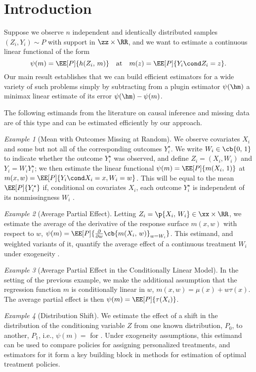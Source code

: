 \documentclass[aos,submission]{imsart}
\theoremstyle{plain}
\theoremstyle{remark}
\newtheorem{exam}{Example}
\begin{document}
\section{Introduction}
\label{sec:introduction}
Suppose we observe
$n$ independent and identically distributed samples $(Z_i, Y_i) \sim P$ with support in $\zz \times \RR$,
and we want to estimate a continuous linear functional of the form
\begin{equation}
\label{eq:psi}
\psi(m) = \EE[P]{h(Z_i, \, m)} \ \ \text{ at } \ \ m(z) = \EE[P]{Y_i \cond Z_i = z}. 
\end{equation}
Our main result establishes that we can build 
efficient estimators for a wide variety of such problems simply by subtracting from 
a plugin estimator $\psi(\hm)$ a minimax linear estimate of its error $\psi(\hm)-\psi(m)$. 

The following estimands from the literature on causal inference and missing data are of this type 
and can be estimated efficiently by our approach.

\begin{exam}[Mean with Outcomes Missing at Random]
\label{exam:mar}
We observe covariates $X_i$ and some but not all of the corresponding outcomes $Y_i^{\star}$.
We write $W_i \in \cb{0, \, 1}$ to indicate whether the outcome $Y_i^{\star}$ was observed, 
and define $Z_i=(X_i, W_i)$ and $Y_i=W_i Y_i^{\star}$; we then estimate the 
linear functional $\psi(m) = \EE[P]{m(X_i, \, 1)}$ at $m(x,w) = \EE[P]{Y_i \cond X_i=x, W_i=w}$.
This will be equal to the mean $\EE[P]{Y^{\star}_i}$ if, conditional on covariates $X_i$,
each outcome $Y_i^{\star}$ is independent of its nonmissingness $W_i$ \citep{rosenbaum1983central}. 
\end{exam}
\begin{exam}[Average Partial Effect]
\label{exam:ape}
Letting $Z_i = \p{X_i, \, W_i} \in \xx \times \RR$, we estimate the average of the derivative of
the response surface $m(x,w)$ with respect to $w$,
$\psi(m) = \EE[P]{\frac{\partial}{\partial w} \cb{m(X_i, \, w)}_{w = W_i} }$.
This estimand, and weighted variants of it, quantify the
average effect of a continuous treatment $W_i$ under exogeneity \citep*{powell1989semiparametric}.
\end{exam}
\begin{exam}[Average Partial Effect in the Conditionally Linear Model]
\label{exam:ape-linear}
In the setting of the previous example, we make the additional assumption that the 
regression function $m$ is conditionally linear in $w$, $m(x,w) = \mu(x) + w\tau(x)$.
The average partial effect is then $\psi(m) = \EE[P]{\tau(X_i)}$.
\end{exam}
\begin{exam}[Distribution Shift]
\label{exam:distribution-shift}
We estimate the effect of a shift in the distribution of the
conditioning variable $Z$ from one known distribution, $P_0$, to another, $P_1$, i.e., $\psi(m) =$  for .
Under exogeneity assumptions, this estimand can be used to compare policies for assigning personalized treatments, and estimators for it form a key building block in methods for estimation of optimal treatment policies.
\end{exam}
\end{document}
